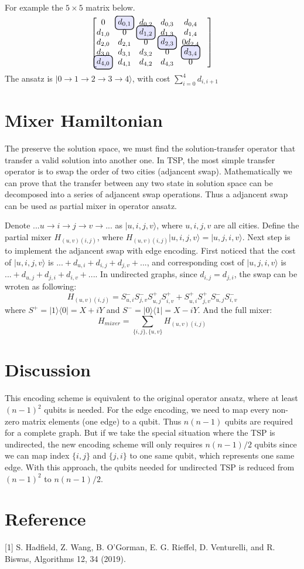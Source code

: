\documentclass[%
aps, %
prl, %
preprint, %
12pt, %
amsfonts, %
amssymb, %
amsmath, %
notitlepage, %
raggedbottom, %
]{revtex4-1}
\newcommand{\bra}[1]{|#1\rangle}
\newcommand\hlight[1]{\tikz[overlay, remember picture,baseline=-\the\dimexpr\fontdimen22\textfont2\relax]\node[rectangle,fill=blue!50,rounded corners,fill opacity = 0.2,draw,thick,text opacity =1] {$#1$};}
\begin{document}
For example the $5\times 5$ matrix below.
$$
\begin{bmatrix}
    0&\hlight{d_{0,1}}&d_{0,2}&d_{0,3}&d_{0,4}&\\
    d_{1,0}&0&\hlight{d_{1,2}}&d_{1,3}&d_{1,4}&\\
    d_{2,0}&d_{2,1}&0&\hlight{d_{2,3}}&0d_{2,4}&\\
    d_{3,0}&d_{3,1}&d_{3,2}&0&\hlight{d_{3,4}}&\\
    \hlight{d_{4,0}}&d_{4,1}&d_{4,2}&d_{4,3}&0&\\
\end{bmatrix}
$$
The ansatz is $\bra{0\rightarrow 1 \rightarrow 2\rightarrow 3\rightarrow 4}$, with cost $\sum_{i=0}^4 d_{i,i+1}$


\section{Mixer Hamiltonian}
The preserve the solution space, we must find the solution-transfer operator that transfer a valid solution into another one. In TSP, the most simple transfer operator is to swap the order of two cities (adjancent swap). Mathematically we can prove that the transfer between any two state in solution space can be decomposed into a series of adjancent swap operations. Thus a adjancent swap can be used as partial mixer in operator ansatz.

Denote $...u\rightarrow i \rightarrow j \rightarrow v\rightarrow...$ as $|u,i,j,v\rangle$, where $u, i, j, v$ are all cities. 
Define the partial mixer $H_{(u,v)(i,j)}$, where  $H_{(u,v)(i,j)} |u,i,j,v\rangle =|u,j,i,v\rangle$. Next step is to implement the adjancent swap with edge encoding. First noticed that the cost of $\bra{u,i,j,v}$ is $...+d_{u,i}+d_{i,j}+d_{j,v}+...$, and corresponding cost of $\bra{u,j,i,v}$ is $...+d_{u,j}+d_{j,i}+d_{i,v}+...$. In undirected graphs, since $d_{i,j}=d_{j,i}$, the swap can be wroten as following:
$$
H_{(u,v)(i,j)}= S^-_{u,i}S^-_{j,v}S^+_{u,j}S^+_{i,v}+S^+_{u,i}S^+_{j,v}S^-_{u,j}S^-_{i,v}
$$
where $S^+=|1\rangle\langle 0|=X+i Y$ and $S^-=|0\rangle\langle 1|=X-i Y$.
And the full mixer:
$$
H_{mixer}=\sum_{\{i,j\},\{u,v\}}H_{(u,v)(i,j)}
$$

\section{Discussion}
This encoding scheme is equivalent to the original operator ansatz, where at least $(n-1)^2$ qubits is needed. For the edge encoding, we need to map every non-zero matrix elements (one edge) to a qubit. Thus $n(n-1)$ qubits are required for a complete graph. But if we take the special situation where the TSP is undirected, the new encoding scheme will only requires $n(n-1)/2$ qubits since we can map index $\{i,j\}$ and $\{j,i\}$ to one same qubit, which represents one same edge. With this approach, the qubits needed for undirected TSP is reduced from $(n-1)^2$ to $n(n-1)/2$.


\section{Reference}
[1] S. Hadfield, Z. Wang, B. O’Gorman, E. G. Rieffel, D. Venturelli, and R. Biswas, Algorithms 12, 34 (2019).
\end{document}
